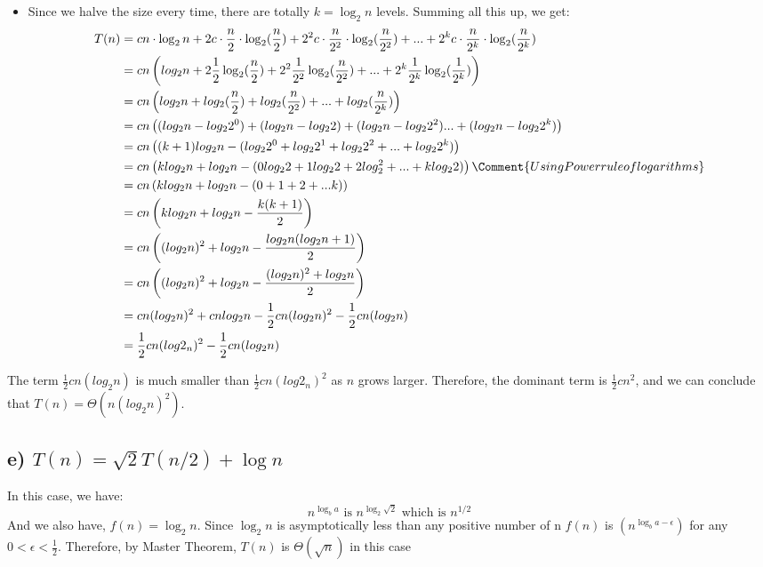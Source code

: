 \documentclass{article}
\begin{document}
	\begin{itemize}
		\item Since we halve the size every time, there are totally \( k = \log_{2}n \) levels. Summing all this up, we get:
		\begin{align}
			T(n) &= cn \cdot \log_2n + 2c\cdot \frac{n}{2} \cdot \log_2(\frac{n}{2}) + 2^2c\cdot \frac{n}{2^2} \cdot \log_2(\frac{n}{2^2}) + ... + 2^kc\cdot \frac{n}{2^k} \cdot \log_2(\frac{n}{2^k})\\\
			     &= cn\left(log_2n + 2\frac{1}{2}\log_2(\frac{n}{2}) + 2^2\frac{1}{2^2}\log_2(\frac{n}{2^2}) +... + 2^k\frac{1}{2^k} \log_2(\frac{1}{2^k})\right) \\
				 &= cn\left(log_2n + log_2(\frac{n}{2}) + log_2(\frac{n}{2^2}) + ... + log_2(\frac{n}{2^k})\right) \\
				 &= cn\left((log_2n - log_22^0)+ (log_2n - log_22) + (log_2n - log_22^2) ... + (log_2n - log_22^k)\right) \\
				 &= cn\left((k + 1)log_2n - (log_22^0 + log_22^1 + log_22^2 + ... + log_22^k)\right) \\
				 &= cn\left(klog_2n + log_2n - (0log_22 + 1log_22 + 2 log_2^2 + ... + klog_22 )\right) \Comment{Using Power rule of logarithms} \\
				 &= cn\left(klog_2n + log_2n - (0 + 1 + 2 + ... k)\right) \\
				 &= cn\left(klog_2n + log_2n - \frac{k(k + 1)}{2}\right) \\
				 &= cn\left((log_2n)^2 + log_2n - \frac{log_2n(log_2n + 1)}{2}\right) \\
				 &= cn\left((log_2n)^2 + log_2n - \frac{(log_2n)^2 + log_2n}{2}\right) \\
				 &= cn(log_2n)^2 + cnlog_2n - \frac{1}{2}cn(log_2n)^2 - \frac{1}{2}cn(log_2n)\\
				 &= \frac{1}{2}cn(log2_n)^2 -  \frac{1}{2}cn(log_2n) \\
		\end{align}
	\end{itemize}
	The term \(\frac{1}{2}cn(log_2n)\) is much smaller than \(\frac{1}{2}cn(log2_n)^2\) as \(n\) grows larger. Therefore, the dominant term is \(\frac{1}{2}cn^2\), and we can conclude that \(T(n) = \Theta(n(log_2n)^2)\).

	\subsection*{e) \(T(n) = \sqrt{2}T(n/2) + \log n\)}

	In this case, we have:
	\[n^{\log_b{a}} \text{ is } n^{\log_2\sqrt{2}} \text{ which is } n^{1/2}\]
	And we also have, \(f(n) = \log_2n\). Since \(\log_2n\) is asymptotically less than any positive number of n \(f(n)\) is \((n^{\log_ba - \epsilon})\) for any \(0 < \epsilon < \frac{1}{2}\). Therefore, by Master Theorem, \(T(n)\) is \(\Theta(\sqrt{n})\) in this case
	
\end{document}
